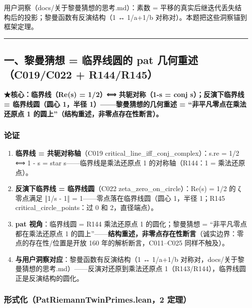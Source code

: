 \documentclass[
]{article}
\providecommand{\tightlist}{%
  \setlength{\itemsep}{0pt}\setlength{\parskip}{0pt}}
\begin{document}
用户洞察（docs/关于黎曼猜想的思考.md）：素数 =
平移的真实后继迭代丢失结构后的投影；黎曼函数有反演结构（1 ↔ 1/a+1/b
对称对）。本题把这些洞察锚到框架定理。

\begin{center}\rule{0.5\linewidth}{0.5pt}\end{center}

\subsection{一、黎曼猜想 = 临界线圆的 pat 几何重述（C019/C022 +
R144/R145）}\label{ux4e00ux9eceux66fcux731cux60f3-ux4e34ux754cux7ebfux5706ux7684-pat-ux51e0ux4f55ux91cdux8ff0c019c022-r144r145}

\textbf{★核心：临界线（Re(s) = 1/2）⟺ 共轭对称（1-s = conj
s）；反演下临界线 = 临界线圆（圆心 1，半径 1）------黎曼猜想的几何重述 =
``非平凡零点在乘法还原点 1 的圆上''（结构重述，非零点存在性断言）。}

\subsubsection{论证}\label{ux8bbaux8bc1}

\begin{enumerate}
\def\labelenumi{\arabic{enumi}.}
\tightlist
\item
  \textbf{临界线 = 共轭对称轴}（C019
  critical\_line\_iff\_conj\_complex）：s.re = 1/2 ⟺ 1 - s = star
  s------临界线是乘法还原点 1 的对称轴（R144：1 = 乘法还原点）。
\item
  \textbf{反演下临界线 = 临界线圆}（C022 zeta\_zero\_on\_circle）：Re(s)
  = 1/2 的 ζ 零点满足 ‖1/s - 1‖ = 1------零点落在临界线圆（圆心 1，半径
  1；R145 critical\_circle\_points：过 0 和 2，直径端点）。
\item
  \textbf{pat 视角}：临界线圆 = R144 乘法还原点 1 的圆化；黎曼猜想 =
  ``非平凡零点都在乘法还原点 1
  的圆上''------\textbf{结构重述，非零点存在性断言}（诚实边界：零点的存在性/位置是开放
  160 年的解析断言，C011--C025 同样不触及）。
\item
  \textbf{与用户洞察对应}：黎曼函数有反演结构（1 ↔ 1/a+1/b
  对称对，docs/关于黎曼猜想的思考.md）------反演对还原到乘法还原点
  1（R143/R144），临界线圆正是反演结构的圆化。
\end{enumerate}

\subsubsection{形式化（PatRiemannTwinPrimes.lean，2
定理）}\label{ux5f62ux5f0fux5316patriemanntwinprimes.lean2-ux5b9aux7406}
\end{document}
